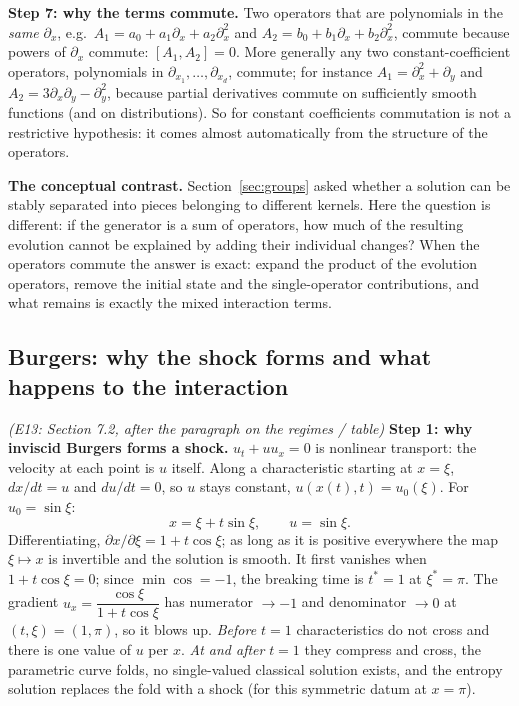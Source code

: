 \medskip\textbf{Step 7: why the terms commute.} Two operators that are polynomials in the \emph{same} $\partial_x$, e.g.\ $A_1=a_0+a_1\partial_x+a_2\partial_x^2$ and $A_2=b_0+b_1\partial_x+b_2\partial_x^2$, commute because powers of $\partial_x$ commute: $[A_1,A_2]=0$. More generally any two constant-coefficient operators, polynomials in $\partial_{x_1},\dots,\partial_{x_d}$, commute; for instance $A_1=\partial_x^2+\partial_y$ and $A_2=3\partial_x\partial_y-\partial_y^2$, because partial derivatives commute on sufficiently smooth functions (and on distributions). So for constant coefficients commutation is not a restrictive hypothesis: it comes almost automatically from the structure of the operators.

\medskip\textbf{The conceptual contrast.} Section~\ref{sec:groups} asked whether a solution can be stably separated into pieces belonging to different kernels. Here the question is different: if the generator is a sum of operators, how much of the resulting evolution cannot be explained by adding their individual changes? When the operators commute the answer is exact: expand the product of the evolution operators, remove the initial state and the single-operator contributions, and what remains is exactly the mixed interaction terms.

\subsection{Burgers: why the shock forms and what happens to the interaction}\label{expl:E13}
\noindent\emph{(E13: Section 7.2, after the paragraph on the regimes / table)}
\textbf{Step 1: why inviscid Burgers forms a shock.} $u_t+uu_x=0$ is nonlinear transport: the velocity at each point is $u$ itself. Along a characteristic starting at $x=\xi$, $dx/dt=u$ and $du/dt=0$, so $u$ stays constant, $u(x(t),t)=u_0(\xi)$. For $u_0=\sin\xi$:
\[
x=\xi+t\sin\xi,\qquad u=\sin\xi .
\]
Differentiating, $\partial x/\partial\xi=1+t\cos\xi$; as long as it is positive everywhere the map $\xi\mapsto x$ is invertible and the solution is smooth. It first vanishes when $1+t\cos\xi=0$; since $\min\cos=-1$, the breaking time is $t^*=1$ at $\xi^*=\pi$. The gradient $u_x=\dfrac{\cos\xi}{1+t\cos\xi}$ has numerator $\to-1$ and denominator $\to0$ at $(t,\xi)=(1,\pi)$, so it blows up. \emph{Before $t=1$} characteristics do not cross and there is one value of $u$ per $x$. \emph{At and after} $t=1$ they compress and cross, the parametric curve folds, no single-valued classical solution exists, and the entropy solution replaces the fold with a shock (for this symmetric datum at $x=\pi$).

